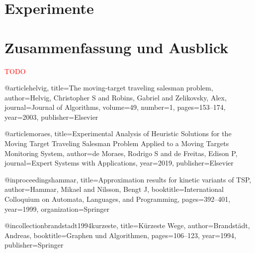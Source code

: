 \documentclass[german,version-2019-11]{uzl-thesis}
\begin{document}
\chapter{Experimente}


\chapter{Zusammenfassung und Ausblick}
\textcolor{red}{TODO}



\begin{bibtex-entries}
@article{helvig,
  title={The moving-target traveling salesman problem},
  author={Helvig, Christopher S and Robins, Gabriel and Zelikovsky, Alex},
  journal={Journal of Algorithms},
  volume={49},
  number={1},
  pages={153--174},
  year={2003},
  publisher={Elsevier}
}

@article{moraes,
  title={Experimental Analysis of Heuristic Solutions for the Moving Target Traveling Salesman Problem Applied to a Moving Targets Monitoring System},
  author={de Moraes, Rodrigo S and de Freitas, Edison P},
  journal={Expert Systems with Applications},
  year={2019},
  publisher={Elsevier}
}

@inproceedings{hammar,
  title={Approximation results for kinetic variants of TSP},
  author={Hammar, Mikael and Nilsson, Bengt J},
  booktitle={International Colloquium on Automata, Languages, and Programming},
  pages={392--401},
  year={1999},
  organization={Springer}
}

@incollection{brandstadt1994kurzeste,
  title={K{\"u}rzeste Wege},
  author={Brandst{\"a}dt, Andreas},
  booktitle={Graphen und Algorithmen},
  pages={106--123},
  year={1994},
  publisher={Springer}
}
\end{bibtex-entries}



%
%
%
%
\end{document}

